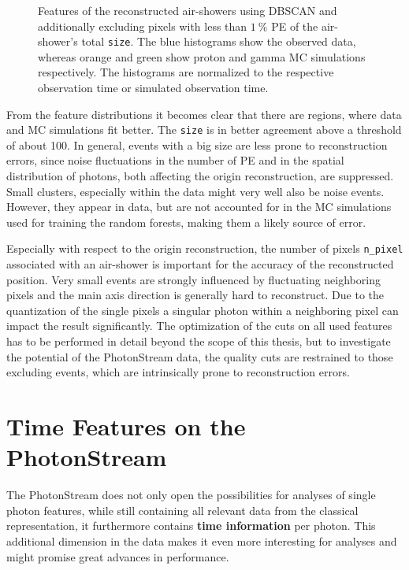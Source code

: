 \begin{figure}
\begin{subfigure}{0.5\textwidth}
  \end{subfigure}
  \caption{Features of the reconstructed air-showers using DBSCAN and additionally excluding pixels with less than $\SI{1}{\percent}$ PE of the air-shower's total \texttt{size}. The blue histograms show the observed data, whereas orange and green show proton and gamma MC simulations respectively. The histograms are normalized to the respective observation time or simulated observation time.}
  \label{fig:feat_dbscan_perc}
\end{figure}
%
From the feature distributions it becomes clear that there are regions, where
data and MC simulations fit better. The \texttt{size} is in better agreement
above a threshold of about \num{100}. In general, events with a big size are
less prone to reconstruction errors, since  noise fluctuations in the number of
PE and in the spatial distribution of photons, both affecting the origin
reconstruction, are suppressed. Small clusters, especially within the data
might very well also be noise events. However, they appear in data, but are not
accounted for in the MC simulations used for training the random forests, making them a likely source of error.

Especially with respect to the origin reconstruction, the number of pixels
\texttt{n\_pixel} associated with an air-shower is important for the accuracy
of the reconstructed position. Very small events are strongly influenced by
fluctuating neighboring pixels and the main axis direction is generally hard to
reconstruct. Due to the quantization of the single pixels a singular photon
within a neighboring pixel can impact the result significantly.
The optimization of the cuts on all used features has to be performed in
detail beyond the scope of this thesis, but to investigate the potential of the
PhotonStream data, the quality cuts are restrained to those excluding events,
which are intrinsically prone to reconstruction errors.

\section{Time Features on the PhotonStream}
%
The PhotonStream does not only open the possibilities for analyses of single
photon features, while still containing all relevant data from the classical
representation, it furthermore contains \textbf{time information} per photon.
This additional dimension in the data makes it even more interesting for
analyses and might promise great advances in performance.

